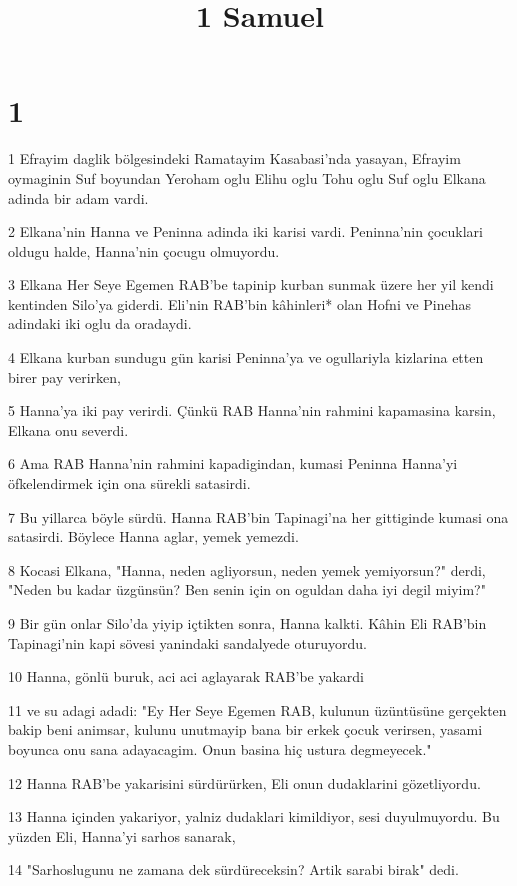 

\title{1 Samuel}


\chapter{1}

\par 1 Efrayim daglik bölgesindeki Ramatayim Kasabasi'nda yasayan, Efrayim oymaginin Suf boyundan Yeroham oglu Elihu oglu Tohu oglu Suf oglu Elkana adinda bir adam vardi.
\par 2 Elkana'nin Hanna ve Peninna adinda iki karisi vardi. Peninna'nin çocuklari oldugu halde, Hanna'nin çocugu olmuyordu.
\par 3 Elkana Her Seye Egemen RAB'be tapinip kurban sunmak üzere her yil kendi kentinden Silo'ya giderdi. Eli'nin RAB'bin kâhinleri* olan Hofni ve Pinehas adindaki iki oglu da oradaydi.
\par 4 Elkana kurban sundugu gün karisi Peninna'ya ve ogullariyla kizlarina etten birer pay verirken,
\par 5 Hanna'ya iki pay verirdi. Çünkü RAB Hanna'nin rahmini kapamasina karsin, Elkana onu severdi.
\par 6 Ama RAB Hanna'nin rahmini kapadigindan, kumasi Peninna Hanna'yi öfkelendirmek için ona sürekli satasirdi.
\par 7 Bu yillarca böyle sürdü. Hanna RAB'bin Tapinagi'na her gittiginde kumasi ona satasirdi. Böylece Hanna aglar, yemek yemezdi.
\par 8 Kocasi Elkana, "Hanna, neden agliyorsun, neden yemek yemiyorsun?" derdi, "Neden bu kadar üzgünsün? Ben senin için on oguldan daha iyi degil miyim?"
\par 9 Bir gün onlar Silo'da yiyip içtikten sonra, Hanna kalkti. Kâhin Eli RAB'bin Tapinagi'nin kapi sövesi yanindaki sandalyede oturuyordu.
\par 10 Hanna, gönlü buruk, aci aci aglayarak RAB'be yakardi
\par 11 ve su adagi adadi: "Ey Her Seye Egemen RAB, kulunun üzüntüsüne gerçekten bakip beni animsar, kulunu unutmayip bana bir erkek çocuk verirsen, yasami boyunca onu sana adayacagim. Onun basina hiç ustura degmeyecek."
\par 12 Hanna RAB'be yakarisini sürdürürken, Eli onun dudaklarini gözetliyordu.
\par 13 Hanna içinden yakariyor, yalniz dudaklari kimildiyor, sesi duyulmuyordu. Bu yüzden Eli, Hanna'yi sarhos sanarak,
\par 14 "Sarhoslugunu ne zamana dek sürdüreceksin? Artik sarabi birak" dedi.
